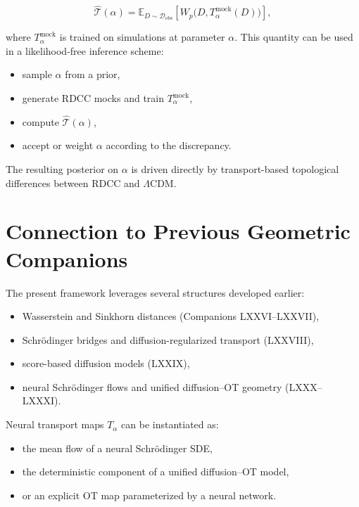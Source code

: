 \documentclass[11pt,a4paper]{article}
\begin{document}
\begin{equation}
    \widehat{\mathcal{T}}(\alpha)
    =
    \mathbb{E}_{D \sim \mathcal{D}_{\mathrm{obs}}}
    \left[
        W_{p}\bigl(D, T_{\alpha}^{\mathrm{mock}}(D)\bigr)
    \right],
\end{equation}

where $T_{\alpha}^{\mathrm{mock}}$ is trained on simulations at parameter 
$\alpha$. This quantity can be used in a likelihood-free inference scheme:

\begin{itemize}
    \item sample $\alpha$ from a prior,
    \item generate RDCC mocks and train $T_{\alpha}^{\mathrm{mock}}$,
    \item compute $\widehat{\mathcal{T}}(\alpha)$,
    \item accept or weight $\alpha$ according to the discrepancy.
\end{itemize}

The resulting posterior on $\alpha$ is driven directly by transport-based 
topological differences between RDCC and $\Lambda$CDM.
\section{Connection to Previous Geometric Companions}

The present framework leverages several structures developed earlier:

\begin{itemize}
    \item Wasserstein and Sinkhorn distances (Companions LXXVI--LXXVII),
    \item Schrödinger bridges and diffusion-regularized transport (LXXVIII),
    \item score-based diffusion models (LXXIX),
    \item neural Schrödinger flows and unified diffusion--OT geometry (LXXX--LXXXI).
\end{itemize}

Neural transport maps $T_{\alpha}$ can be instantiated as:

\begin{itemize}
    \item the mean flow of a neural Schrödinger SDE,
    \item the deterministic component of a unified diffusion--OT model,
    \item or an explicit OT map parameterized by a neural network.
\end{itemize}
\end{document}
